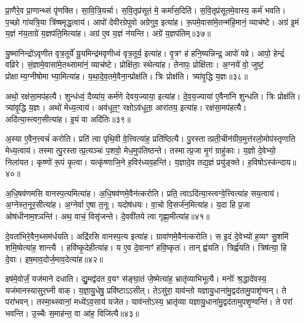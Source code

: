 प्रा॒णैरे॒व प्रा॒णान्थ्सं पृ॑णक्ति।
सा॒वि॒त्रि॒यर्चा।
स॒वि॒तृप्र॑सूतं मे॒ कर्मा॑स॒दिति॑।
स॒वि॒तृप्र॑सूतमे॒वास्य॒ कर्म॑ भवति।
प॒च्छो गा॑यत्रि॒या त्रि॑ष्षमृद्ध॒त्वाय॑।
आपो॑ देवीरग्रेपुवो अग्रेगुव॒ इत्या॑ह।
रू॒पमे॒वासा॑मे॒तन्म॑हि॒मानं॒ व्याच॑ष्टे।
अग्र॑ इ॒मं य॒ज्ञं न॑य॒ताग्रे॑ य॒ज्ञप॑ति॒मित्या॑ह।
अग्र॑ ए॒व य॒ज्ञं न॑यन्ति।
अग्रे॑ य॒ज्ञप॑तिम्॥३७॥

यु॒ष्मानिन्द्रो॑\-ऽवृणीत वृत्र॒तूर्ये॑ यू॒यमिन्द्र॑मवृणीध्वं वृत्र॒तूर्य॒ इत्या॑ह।
वृ॒त्रꣳ ह॑ हनि॒ष्यन्निन्द्र॒ आपो॑ वव्रे।
आपो॒ हेन्द्रं॑ वव्रिरे।
सं॒ज्ञामे॒वासा॑मे॒तथ्सामा॑नं॒ व्याच॑ष्टे।
प्रोक्षि॑ताः॒ स्थेत्या॑ह।
तेनापः॒ प्रोक्षि॑ताः।
अ॒ग्नये॑ वो॒ जुष्टं॒ प्रोक्षाम्य॒ग्नीषोमाभ्या॒मित्या॑ह।
य॒था॒दे॒व॒तमे॒वैना॒न्प्रोक्ष॑ति।
त्रिः प्रोक्ष॑ति।
त्र्या॑वृ॒द्धि य॒ज्ञः॥३८॥

अथो॒ रक्ष॑सा॒मप॑हत्यै।
शुन्ध॑ध्वं॒ दैव्या॑य॒ कर्म॑णे देवय॒ज्याया॒ इत्या॑ह।
दे॒व॒य॒ज्याया॑ ए॒वैना॑नि शुन्धति।
त्रिः प्रोक्ष॑ति।
त्र्या॑वृ॒द्धि य॒ज्ञः।
अथो॑ मेध्य॒त्वाय॑।
अव॑धूत॒ꣳ॒ रक्षो\-ऽव॑धूता॒ आरा॑तय॒ इत्या॑ह।
रक्ष॑सा॒मप॑हत्यै।
अदि॑त्या॒स्त्वग॒सीत्या॑ह।
इ॒यं वा अदि॑तिः॥३९॥

अ॒स्या ए॒वैन॒त्त्वचं॑ करोति।
प्रति॑ त्वा पृथि॒वी वे॒त्त्वित्या॑ह॒ प्रति॑ष्ठित्यै।
पु॒रस्तात्प्रती॒चीन॑ग्रीव॒मुत्त॑रलो॒मोप॑स्तृणाति मेध्य॒त्वाय॑।
तस्मात्पु॒रस्तात्प्र॒त्यञ्चः॑ प॒शवो॒ मेध॒मुप॑तिष्ठन्ते।
तस्मात्प्र॒जा मृ॒गं ग्राहु॑काः।
य॒ज्ञो दे॒वेभ्यो॒ निला॑यत।
कृष्णो॑ रू॒पं कृ॒त्वा।
यत्कृ॑ष्णाजि॒ने ह॒विर॑ध्यव॒हन्ति॑।
य॒ज्ञादे॒व तद्य॒ज्ञं प्रयु॑ङ्क्ते।
ह॒विषो\-ऽस्क॑न्दाय॥४०॥

अ॒धि॒षव॑णमसि वानस्प॒त्यमित्या॑ह।
अ॒धि॒षव॑णमे॒वैन॑त्करोति।
प्रति॒ त्वा\-ऽदि॑त्या॒स्त्वग्वे॒त्त्वित्या॑ह सय॒त्वाय॑।
अ॒ग्नेस्त॒नूर॒सी\-त्या॑ह।
अ॒ग्नेर्वा ए॒षा त॒नूः।
यदोष॑धयः।
वा॒चो वि॒सर्ज॑न॒मित्या॑ह।
य॒दा हि प्र॒जा ओष॑धीनाम॒श्ञन्ति॑।
अथ॒ वाचं॒ विसृ॑जन्ते।
दे॒ववी॑तये त्वा गृह्णा॒मीत्या॑ह॥४१॥

दे॒वता॑भिरे॒वैन॒थ्सम॑र्धयति।
अद्रि॑रसि वानस्प॒त्य इत्या॑ह।
ग्रावा॑णमे॒वैन॑त्करोति।
स इ॒दं दे॒वेभ्यो॑ ह॒व्यꣳ सु॒शमि॑ शमि॒ष्वेत्या॑ह॒ शान्त्यै।
हवि॑ष्कृ॒देहीत्या॑ह।
य ए॒व दे॒वानाꣳ॑ हवि॒ष्कृतः॑।
तान्‌ ह्व॑यति।
त्रिर्ह्व॑यति।
त्रिष॑त्या॒ हि दे॒वाः।
इष॒माव॒दोर्ज॒माव॒देत्या॑ह॥४२॥

इष॑मे॒वोर्जं॒ यज॑माने दधाति।
द्यु॒मद्व॑दत व॒यꣳ स॑ङ्घा॒तं जे॒ष्मेत्या॑ह॒ भ्रातृ॑व्याभिभूत्यै।
मनोः᳚ श्र॒द्धादे॑वस्य॒ यज॑मानस्या\-सुर॒घ्नी वाक्।
य॒ज्ञा॒यु॒धेषु॒ प्रवि॑ष्टा\-ऽऽसीत्।
तेऽसु॑रा॒ याव॑न्तो यज्ञायु॒धाना॑मु॒द्वद॑तामु॒पाशृ॑ण्वन्।
ते परा॑भवन्।
तस्मा॒थ्स्वानां॒ मध्ये॑\-ऽव॒साय॑ यजेत।
याव॑न्तो\-ऽस्य॒ भ्रातृ॑व्या यज्ञायु॒धाना॑\-मु॒द्वद॑तामुप\-शृ॒ण्वन्ति॑।
ते परा॑ भवन्ति।
उ॒च्चैः स॒माह॑न्त॒ वा आ॑ह॒ विजि॑त्यै॥४३॥


